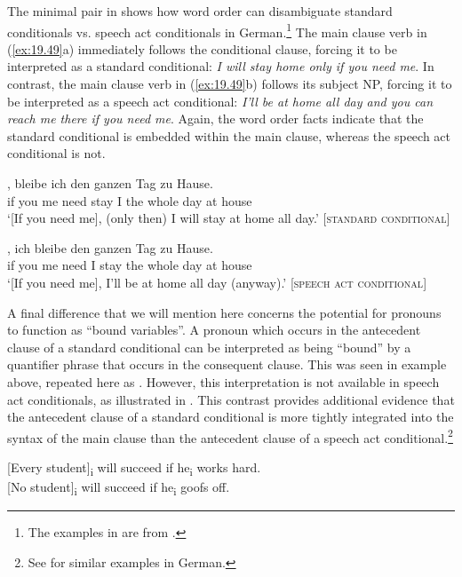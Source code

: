 The minimal pair in  shows how word order can disambiguate standard conditionals vs. speech act conditionals in German.\footnote{The examples in  are from \citet[102]{Scheffler2013}.} The main clause verb in (\ref{ex:19.49}a) immediately follows the conditional clause, forcing it to be interpreted as a standard conditional: \textit{I will stay home only if you need me}. In contrast, the main clause verb in (\ref{ex:19.49}b) follows its subject NP, forcing it to be interpreted as a speech act conditional: \textit{I’ll be at home all day and you can reach me there if you need me}. Again, the word order facts indicate that the standard conditional is embedded within the main clause, whereas the speech act conditional is not.


\ea \label{ex:19.49}
\ea   \gll{},  bleibe  ich  den  ganzen  Tag  zu  Hause.\\
 if  you  me  need  stay  I  the  whole  day  at  house\\
\glt ‘[If you need me], (only then) I will stay at home all day.’  [\textsc{standard conditional}]

\ex
  \gll{},  ich  bleibe  den  ganzen  Tag  zu  Hause.\\
 if  you  me  need  I  stay  the  whole  day  at  house\\
\glt ‘[If you need me], I’ll be at home all day (anyway).’   [\textsc{speech act} \textsc{conditional}]
\z
\z

A final difference that we will mention here concerns the potential for pronouns to function as “bound variables”. A pronoun which occurs in the antecedent clause of a standard conditional can be interpreted as being “bound” by a quantifier phrase that occurs in the consequent clause. This was seen in example  above, repeated here as . However, this interpretation is not available in speech act conditionals, as illustrated in . This contrast provides additional evidence that the antecedent clause of a standard conditional is more tightly integrated into the syntax of the main clause than the antecedent clause of a speech act conditional.\footnote{See \citet{EbertEtAl2008} for similar examples in German.}


\ea \label{ex:19.50}
\ea {} [Every student]\textsubscript{i} will succeed if he\textsubscript{i} works hard.\\
\ex{} [No student]\textsubscript{i} will succeed if he\textsubscript{i} goofs off.
\z
\z

